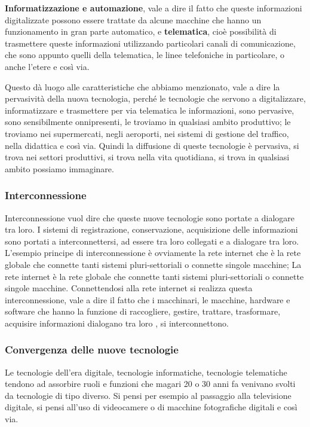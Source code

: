 \textbf{Informatizzazione e automazione}, vale a dire il fatto che queste informazioni digitalizzate possono essere trattate da alcune macchine che hanno un funzionamento in gran parte automatico, e \textbf{telematica}, cioè possibilità di trasmettere queste informazioni utilizzando particolari canali di comunicazione, che sono appunto quelli della telematica, le linee telefoniche in particolare, o anche l'etere e così via. \par
Questo dà luogo alle caratteristiche che abbiamo menzionato, vale a dire la pervasività della nuova tecnologia, perché le tecnologie che servono a digitalizzare, informatizzare e trasmettere per via telematica le informazioni, sono pervasive, sono sensibilmente onnipresenti, le troviamo in qualsiasi ambito produttivo; le troviamo nei supermercati, negli aeroporti, nei sistemi di gestione del traffico, nella didattica e così via. Quindi la diffusione di queste tecnologie è pervasiva, si trova nei settori produttivi, si trova nella vita quotidiana, si trova in qualsiasi ambito possiamo immaginare.

\subsubsection*{Interconnessione}
Interconnessione vuol dire che queste nuove tecnologie sono portate a dialogare tra loro. I sistemi di registrazione, conservazione, acquisizione delle informazioni sono portati a interconnettersi, ad essere tra loro collegati e a dialogare tra loro. L'esempio principe di interconnessione è ovviamente la rete internet che è la rete globale che connette tanti sistemi pluri-settoriali o connette singole macchine; La rete internet è la rete globale che connette tanti sistemi pluri-settoriali o connette singole macchine. Connettendosi alla rete internet si realizza questa interconnessione, vale a dire il fatto che i macchinari, le macchine, hardware e software che hanno la funzione di raccogliere, gestire, trattare, trasformare, acquisire informazioni dialogano tra loro , si interconnettono.\par

\subsubsection*{Convergenza delle nuove tecnologie}

Le tecnologie dell'era digitale, tecnologie informatiche, tecnologie telematiche tendono ad assorbire ruoli e funzioni che magari 20 o 30 anni fa venivano svolti da tecnologie di tipo diverso. Si pensi per esempio al passaggio alla televisione digitale, si pensi all'uso di videocamere o di macchine fotografiche digitali e così via. 

